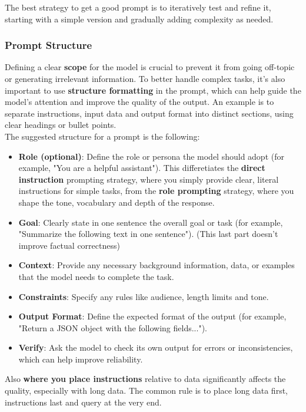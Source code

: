 The best strategy to get a good prompt is to iteratively test and refine it, starting with a simple version and gradually adding complexity as needed.

\subsubsection{Prompt Structure}
Defining a clear \textbf{scope} for the model is crucial to prevent it from going off-topic or generating irrelevant information.
To better handle complex tasks, it's also important to use \textbf{structure formatting} in the prompt, which can help guide the model's attention and improve the quality of the output.
An example is to separate instructions, input data and output format into distinct sections, using clear headings or bullet points.
\\
The suggested structure for a prompt is the following:
\begin{itemize}
    \item \textbf{Role (optional)}: Define the role or persona the model should adopt (for example, "You are a helpful assistant").
    This differetiates the \textbf{direct instruction} prompting strategy, where you simply provide clear, literal instructions for simple tasks, from the \textbf{role prompting} strategy, where you shape the tone, vocabulary and depth of the response.
    \item \textbf{Goal}: Clearly state in one sentence the overall goal or task (for example, "Summarize the following text in one sentence"). (This last part doesn't improve factual correctness)
    \item \textbf{Context}: Provide any necessary background information, data, or examples that the model needs to complete the task.
    \item \textbf{Constraints}: Specify any rules like audience, length limits and tone.
    \item \textbf{Output Format}: Define the expected format of the output (for example, "Return a JSON object with the following fields...").
    \item \textbf{Verify}: Ask the model to check its own output for errors or inconsistencies, which can help improve reliability.
\end{itemize}
Also \textbf{where you place instructions} relative to data significantly affects the quality, especially with long data.
The common rule is to place long data first, instructions last and query at the very end.

